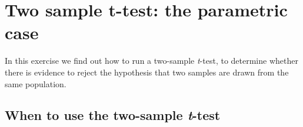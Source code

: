 \documentclass[
  letterpaper,
  DIV=11,
  numbers=noendperiod]{scrreprt}
\begin{document}
\section{Two sample t-test: the parametric
case}\label{two-sample-t-test-the-parametric-case}

In this exercise we find out how to run a two-sample \emph{t}-test, to
determine whether there is evidence to reject the hypothesis that two
samples are drawn from the same population.

\subsection{\texorpdfstring{When to use the two-sample
\emph{t}-test}{When to use the two-sample t-test}}\label{when-to-use-the-two-sample-t-test}
\end{document}
